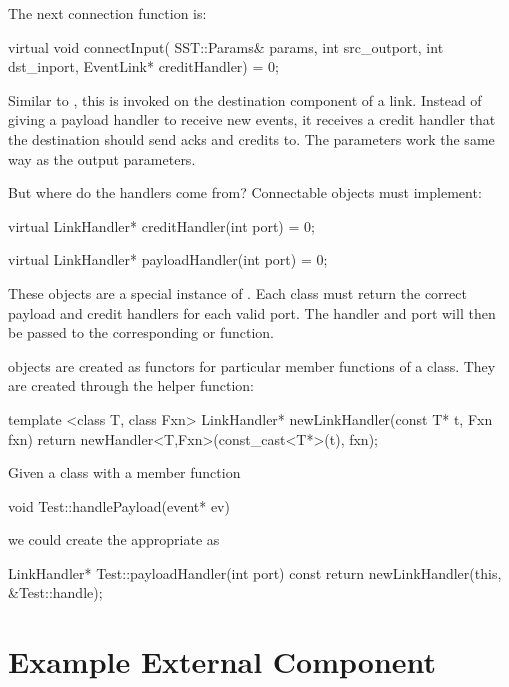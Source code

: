 The next connection function is:
\begin{CppCode}
  virtual void connectInput(
    SST::Params& params,
    int src_outport,
    int dst_inport,
    EventLink* creditHandler) = 0;
\end{CppCode}
Similar to , this is invoked on the destination component of a link.
Instead of giving a payload handler to receive new events,
it receives a credit handler that the destination should send acks and credits to.
The parameters work the same way as the output parameters.

But where do the handlers come from? Connectable objects must implement:

\begin{CppCode}
virtual LinkHandler* creditHandler(int port) = 0;

virtual LinkHandler* payloadHandler(int port) = 0;
\end{CppCode}

These  objects are a special instance of .
Each class must return the correct payload and credit handlers for each valid port.
The handler and port will then be passed to the corresponding  or  function.

 objects are created as functors for particular member functions of a class.
They are created through the helper function:

\begin{CppCode}
template <class T, class Fxn>
LinkHandler* newLinkHandler(const T* t, Fxn fxn){
  return newHandler<T,Fxn>(const_cast<T*>(t), fxn);
}
\end{CppCode}
Given a class  with a member function

\begin{CppCode}
void Test::handlePayload(event* ev)
\end{CppCode}
we could create the appropriate  as

\begin{CppCode}
LinkHandler* Test::payloadHandler(int port) const {
  return newLinkHandler(this, &Test::handle);
}
\end{CppCode}

\section{Example External Component}
\label{sec:exampleComponent}

